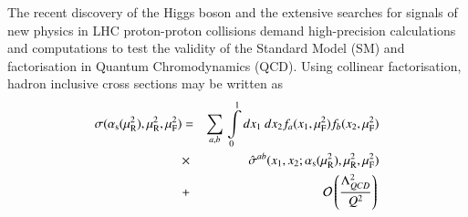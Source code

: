 The recent discovery of the Higgs boson \cite{Aad:2012tfa,Chatrchyan:2012ufa} 
and the extensive searches
for signals of new physics in LHC proton-proton collisions
demand high-precision calculations and computations to test the validity of the Standard Model (SM)
and factorisation in Quantum Chromodynamics (QCD).
Using collinear factorisation, hadron inclusive cross sections may be written as
%
\begin{eqnarray}
\small
%
\sigma(\as(\mur^2),\mur^2,\muf^2)&=& \sum\limits_{a,b}\,  \int\limits_{0}\limits^{1} dx_1\ dx_2  f_a(x_1,\muf^2) f_b(x_2,\muf^2) \nonumber \\ 
&\times&  \, \hat{\sigma}^{ab}(x_1,x_2;\as(\mur^2),\mur^2,\muf^2)  \nonumber \\
&+&{\cal O}\left(\frac{\Lambda_{QCD}^2}{Q^2}\right)\,
\label{eq:fact}
\end{eqnarray}

